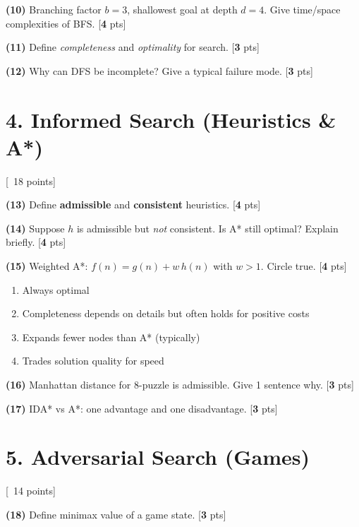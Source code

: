 \documentclass[11pt]{article}
\newcommand{\pts}[1]{\hfill{\small[\textbf{#1} pts]}}
\begin{document}
\noindent\textbf{(10)} Branching factor $b=3$, shallowest goal at depth $d=4$. Give time/space complexities of BFS. \pts{4}

\noindent\textbf{(11)} Define \textit{completeness} and \textit{optimality} for search. \pts{3}

\noindent\textbf{(12)} Why can DFS be incomplete? Give a typical failure mode. \pts{3}

\vspace{0.6em}
\section*{4. Informed Search (Heuristics \& A*)} \hfill {\small[~18 points]}

\noindent\textbf{(13)} Define \textbf{admissible} and \textbf{consistent} heuristics. \pts{4}

\noindent\textbf{(14)} Suppose $h$ is admissible but \emph{not} consistent. Is A* still optimal? Explain briefly. \pts{4}

\noindent\textbf{(15)} Weighted A*: $f(n)=g(n)+w\,h(n)$ with $w>1$. Circle true. \pts{4}
\begin{enumerate}[label=(\alph*)]
\item Always optimal
\item Completeness depends on details but often holds for positive costs
\item Expands fewer nodes than A* (typically)
\item Trades solution quality for speed
\end{enumerate}

\noindent\textbf{(16)} Manhattan distance for 8-puzzle is admissible. Give 1 sentence why. \pts{3}

\noindent\textbf{(17)} IDA* vs A*: one advantage and one disadvantage. \pts{3}

\vspace{0.6em}
\section*{5. Adversarial Search (Games)} \hfill {\small[~14 points]}

\noindent\textbf{(18)} Define minimax value of a game state. \pts{3}
\end{document}
